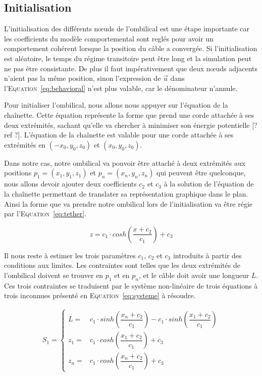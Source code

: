 			
			\subsection{Initialisation}
				L'initialisation des différents n\oe uds de l'ombilical est une étape importante car les coefficients du modèle comportemental sont reglés pour avoir un comportement cohérent lorsque la position du câble a convergée. Si l'initialisation est aléatoire, le temps du régime transitoire peut être long et la simulation peut ne pas être consistante. De plus il faut impérativement que deux n\oe uds adjacents n'aient pas la même position, sinon l'expression de $\overrightarrow{u}$ dans l'\textsc{Equation}~\ref{eq:behavioral} n'est plus valable, car le dénominateur n'annule.
			
				Pour initialiser l'ombilical, nous allons nous appuyer sur l'équation de la chaînette. Cette équation représente la forme que prend une corde attachée à ses deux extrémités, sachant qu'elle va chercher à minimiser son énergie potentielle [? ref ?]. L'équation de la chaînette est valable pour une corde attachée à ses extrémités en $(-x_0, y_0, z_0)$ et $(x_0, y_0, z_0)$.
				
				Dans notre cas, notre ombilical va pouvoir être attaché à deux extrémités aux positions $p_1 = (x_1, y_1, z_1)$ et $p_n = (x_n, y_n, z_n)$ qui peuvent être quelconque, nous allons devoir ajouter deux coefficients $c_2$ et $c_3$ à la solution de l'équation de la chaînette permettant de translater sa représentation graphique dans le plan. Ainsi la forme que va prendre notre ombilical lors de l'initialisation va être régie par l'\textsc{Equation}~\ref{eq:tether}.
			
				\begin{equation}
					z = c_1\cdot cosh\left(\frac{x + c_2}{c_1}\right) + c_3
					\label{eq:tether}
				\end{equation}
			
				Il nous reste à estimer les trois paramètres $c_1$, $c_2$ et $c_3$ introduits à partir des conditions aux limites. Les contraintes sont telles que les deux extrémités de l'ombilical doivent se trouver en $p_1$ et en $p_n$, et le câble doit avoir une longueur $L$. Ces trois contraintes se traduisent par le système non-linéaire de trois équations à trois inconnues présenté en \textsc{Equation}~\ref{eq:systeme} à résoudre.
				
				\begin{align}
					S_1 = 
					\begin{cases}
						L   = & c_1 \cdot sinh\left(\dfrac{x_n+c_2}{c_1}\right) - c_1 \cdot sinh\left(\dfrac{x_1+c_2}{c_1}\right) \\
						z_1 = & c_1 \cdot cosh\left(\dfrac{x_1+c_2}{c_1}\right)+c_3 \\
						z_n = & c_1 \cdot cosh\left(\dfrac{x_n+c_2}{c_1}\right)+c_3
					\end{cases}
					\label{eq:systeme}
				\end{align}
			
